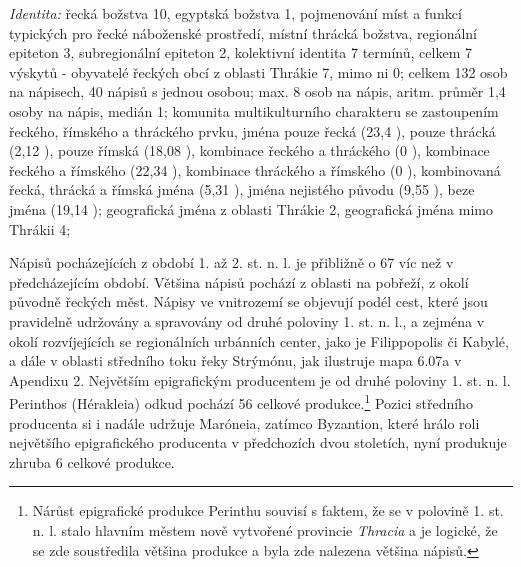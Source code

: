 {\em Identita:} řecká božstva 10, egyptská božstva 1, pojmenování míst a funkcí typických pro řecké náboženské prostředí, místní thrácká božstva, regionální epiteton 3, subregionální epiteton 2, kolektivní identita 7 termínů, celkem 7 výskytů - obyvatelé řeckých obcí z oblasti Thrákie 7, mimo ni 0; celkem 132 osob na nápisech, 40 nápisů s jednou osobou; max. 8 osob na nápis, aritm. průměr 1,4 osoby na nápis, medián 1; komunita multikulturního charakteru se zastoupením řeckého, římského a thráckého prvku, jména pouze řecká (23,4 ), pouze thrácká (2,12 ), pouze římská (18,08 ), kombinace řeckého a thráckého (0 ), kombinace řeckého a římského (22,34 ), kombinace thráckého a římského (0 ), kombinovaná řecká, thrácká a římská jména (5,31 ), jména nejistého původu (9,55 ), beze jména (19,14 ); geografická jména z oblasti Thrákie 2, geografická jména mimo Thrákii 4;

\NC\AR
\HL
\HL
\stoptable

Nápisů pocházejících z období 1. až 2. st. n. l. je přibližně o 67  víc než v předcházejícím období. Většina nápisů pochází z oblasti na pobřeží, z okolí původně řeckých měst. Nápisy ve vnitrozemí se objevují podél cest, které jsou pravidelně udržovány a spravovány od druhé poloviny 1. st. n. l., a zejména v okolí rozvíjejících se regionálních urbánních center, jako je Filippopolis či Kabylé, a dále v oblasti středního toku řeky Strýmónu, jak ilustruje mapa 6.07a v Apendixu 2. Největším epigrafickým producentem je od druhé poloviny 1. st. n. l. Perinthos (Hérakleia) odkud pochází 56  celkové produkce.\footnote{Nárůst epigrafické produkce Perinthu souvisí s faktem, že se v polovině 1. st. n. l. stalo hlavním městem nově vytvořené provincie {\em Thracia} a je logické, že se zde soustředila většina produkce a byla zde nalezena většina nápisů.} Pozici středního producenta si i nadále udržuje Maróneia, zatímco Byzantion, které hrálo roli největšího epigrafického producenta v předchozích dvou stoletích, nyní produkuje zhruba 6  celkové produkce.

